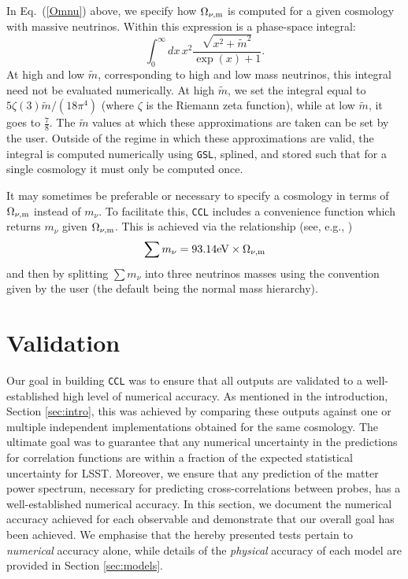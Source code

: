 \documentclass[\docopts]{\docclass}
\newcommand{\ccl}{{\tt CCL}\xspace}
\begin{document}
In Eq.~(\ref{Omnu}) above, we specify how $\Omega_{\nu, {\rm m}}$ is computed for a given cosmology with massive neutrinos. Within this expression is a phase-space integral:
\begin{equation}
\int_0^{\infty} dx \, x^2 \frac{\sqrt{x^2 + \tilde{m}^2}}{\exp(x) + 1}.
\label{phasespacenu}
\end{equation}
At high and low $\tilde{m}$, corresponding to high and low mass neutrinos, this integral need not be evaluated numerically. At high $\tilde{m}$, we set the integral equal to $5\zeta(3)\tilde{m}/(18\pi^4)$ (where $\zeta$ is the Riemann zeta function), while at low $\tilde{m}$, it goes to $\frac{7}{8}$. The $\tilde{m}$ values at which these approximations are taken can be set by the user. Outside of the regime in which these approximations are valid, the integral is computed numerically using {\tt GSL}, splined, and stored such that for a single cosmology it must only be computed once.

It may sometimes be preferable or necessary to specify a cosmology in terms of $\Omega_{\nu, {\rm m}}$ instead of $m_\nu$. To facilitate this, \ccl includes a convenience function which returns $m_\nu$ given $\Omega_{\nu, {\rm m}}$. This is achieved via the relationship (see, e.g., \citealt{Lesgourgues2012})
\begin{equation}
\sum m_\nu = 93.14 {\rm eV} \times \Omega_{\nu, {\rm m}}
\label{summnu_om}
\end{equation}
and then by splitting $\sum m_\nu$ into three neutrinos masses using the convention given by the user (the default being the normal mass hierarchy).


\section{Validation}
\label{sec:validation}

Our goal in building \ccl was to ensure that all outputs are validated to a well-established high level of numerical accuracy. As mentioned in the introduction, Section \ref{sec:intro}, this was achieved by comparing these outputs against one or multiple independent implementations obtained for the same cosmology. The ultimate goal was to guarantee that any numerical uncertainty in the predictions for correlation functions are within a fraction of the expected statistical uncertainty for LSST. Moreover, we ensure that any prediction of the matter power spectrum, necessary for predicting cross-correlations between probes, has a well-established numerical accuracy. In this section, we document the numerical accuracy achieved for each observable and demonstrate that our overall goal has been achieved. We emphasise that the hereby presented tests pertain to {\it numerical} accuracy alone, while details of the {\it physical} accuracy of each model are provided in Section \ref{sec:models}. 
\end{document}
